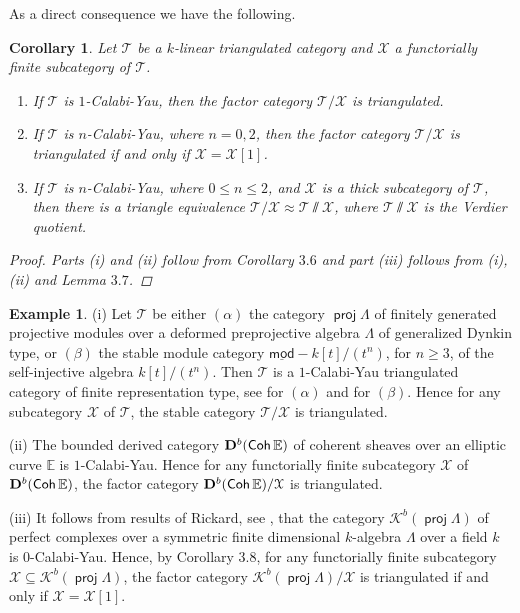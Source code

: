 \documentclass[oneside, a4paper,reqno]{amsart}
\numberwithin{equation}{section}
\newtheorem{cor}[thm]{Corollary}
\theoremstyle{definition}
\newtheorem{exam}[thm]{Example}
\begin{document}
As a direct consequence we have the following. 

\begin{cor} Let ${\mathcal T}$ be a  $k$-linear triangulated category and ${\mathcal X}$ a functorially finite subcategory of ${\mathcal T}$.  
\begin{enumerate} 
\item If ${\mathcal T}$ is $1$-Calabi-Yau, then the factor category ${\mathcal T}/{\mathcal X}$ is triangulated.
\item If ${\mathcal T}$ is $n$-Calabi-Yau, where $n = 0, 2$, then the factor category ${\mathcal T}/{\mathcal X}$ is triangulated  if and only if ${\mathcal X} = {\mathcal X}[1]$.
\item If ${\mathcal T}$ is $n$-Calabi-Yau, where $0 \leq n \leq 2$, and ${\mathcal X}$ is a thick subcategory of ${\mathcal T}$, then there is a triangle equivalence ${\mathcal T}/{\mathcal X} \approx {\mathcal T}\!\sslash \! {\mathcal X}$, where $ {\mathcal T}\!\sslash \! {\mathcal X}$ is the Verdier quotient. 
\end{enumerate}
\begin{proof} Parts (i) and (ii) follow from Corollary $3.6$ and part (iii) follows from (i), (ii) and Lemma  $3.7$.  
\end{proof} 
\end{cor}  

\begin{exam} (i) Let ${\mathcal T}$ be either $(\alpha)$ the category $\operatorname*{\mathsf{proj}} \Lambda$ of finitely generated projective modules over a deformed preprojective
algebra $\Lambda$ of generalized Dynkin type, or $(\beta)$ the stable module category $\operatorname*{\underline{\mathsf{mod}}-\!} k[t]/(t^{n})$, for $n \geq 3$, of the self-injective algebra $k[t]/(t^{n})$.  Then ${\mathcal T}$ is a $1$-Calabi-Yau triangulated category of finite representation type, see \cite{Amiot} for $(\alpha)$ and  \cite{ES} for $(\beta)$. Hence for any subcategory ${\mathcal X}$ of ${\mathcal T}$, the stable category ${\mathcal T}/{\mathcal X}$ is triangulated. 

(ii)  The bounded derived category ${\bf D}^{b}(\mathsf{Coh}\,\mathbb E)$ of coherent sheaves over an elliptic curve $\mathbb E$ is $1$-Calabi-Yau. Hence for any functorially finite subcategory ${\mathcal X}$ of ${\bf D}^{b}(\mathsf{Coh}\,\mathbb E)$, the factor category ${\bf D}^{b}(\mathsf{Coh}\,\mathbb E)/{\mathcal X}$  is triangulated. 

(iii) It follows from results of Rickard, see \cite{Rickard}, that the category ${\mathcal K}^{b}(\operatorname*{\mathsf{proj}}\Lambda)$ of perfect complexes over a symmetric finite dimensional $k$-algebra $\Lambda$ over a field $k$ is $0$-Calabi-Yau. Hence, by Corollary $3.8$, for any functorially finite subcategory ${\mathcal X} \subseteq {\mathcal K}^{b}(\operatorname*{\mathsf{proj}}\Lambda)$, the factor category ${\mathcal K}^{b}(\operatorname*{\mathsf{proj}}\Lambda)/{\mathcal X}$ is triangulated if and only if ${\mathcal X}  = {\mathcal X}[1]$.    
\end{exam} 
\end{document}
